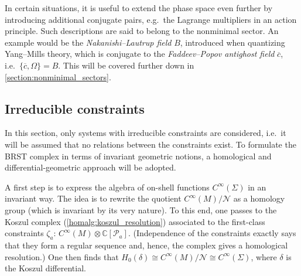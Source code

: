     \begin{remark}
        In certain situations, it is useful to extend the phase space even further by introducing additional conjugate pairs, e.g.~the Lagrange multipliers in an action principle. Such descriptions are said to belong to the nonminimal sector. An example would be the \textit{Nakanishi--Lautrup field} $B$, introduced when quantizing Yang--Mills theory, which is conjugate to the \textit{Faddeev--Popov antighost field} $\overline{c}$, i.e.~$\{\overline{c},\Omega\}=B$. This will be covered further down in \cref{section:nonminimal_sectors}.
    \end{remark}

\subsection{Irreducible constraints}\label{section:irreducible_constraints}

    In this section, only systems with irreducible constraints are considered, i.e.~it will be assumed that no relations between the constraints exist. To formulate the BRST complex in terms of invariant geometric notions, a homological and differential-geometric approach will be adopted.

    A first step is to express the algebra of on-shell functions $C^\infty(\Sigma)$ in an invariant way. The idea is to rewrite the quotient $C^\infty(M)/\mathcal{N}$ as a homology group (which is invariant by its very nature). To this end, one passes to the Koszul complex (\cref{homalg:koszul_resolution}) associated to the first-class constraints $\zeta_a$: $C^\infty(M)\otimes\mathbb{C}[\mathcal{P}_a]$. (Independence of the constraints exactly says that they form a regular sequence and, hence, the complex gives a homological resolution.) One then finds that $H_0(\delta)\cong C^\infty(M)/\mathcal{N}\cong C^\infty(\Sigma)$, where $\delta$ is the Koszul differential.

